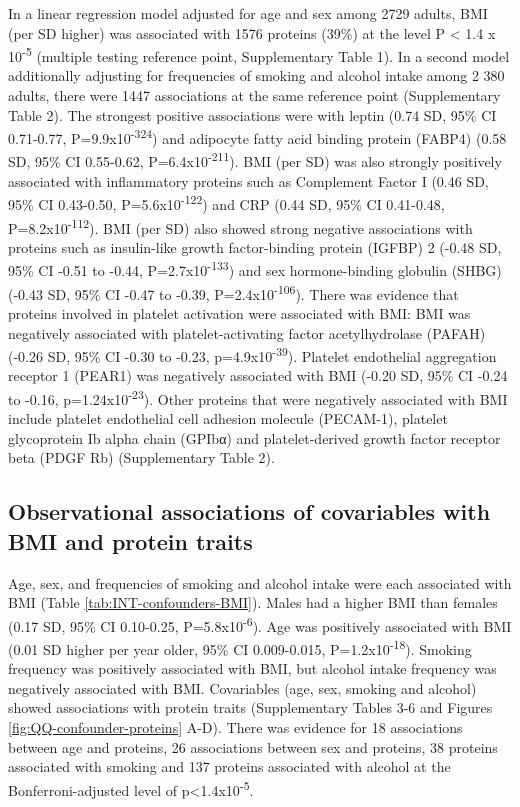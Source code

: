 \documentclass[11pt,twoside]{bristolthesis}
\begin{document}
In a linear regression model adjusted for age and sex among 2729 adults, BMI (per SD higher) was associated with 1576 proteins (39\%) at the level P \textless{} 1.4 x 10\textsuperscript{-5} (multiple testing reference point, Supplementary Table 1). In a second model additionally adjusting for frequencies of smoking and alcohol intake among 2 380 adults, there were 1447 associations at the same reference point (Supplementary Table 2). The strongest positive associations were with leptin (0.74 SD, 95\% CI 0.71-0.77, P=9.9x10\textsuperscript{-324}) and adipocyte fatty acid binding protein (FABP4) (0.58 SD, 95\% CI 0.55-0.62, P=6.4x10\textsuperscript{-211}). BMI (per SD) was also strongly positively associated with inflammatory proteins such as Complement Factor I (0.46 SD, 95\% CI 0.43-0.50, P=5.6x10\textsuperscript{-122}) and CRP (0.44 SD, 95\% CI 0.41-0.48, P=8.2x10\textsuperscript{-112}). BMI (per SD) also showed strong negative associations with proteins such as insulin-like growth factor-binding protein (IGFBP) 2 (-0.48 SD, 95\% CI -0.51 to -0.44, P=2.7x10\textsuperscript{-133}) and sex hormone-binding globulin (SHBG) (-0.43 SD, 95\% CI -0.47 to -0.39, P=2.4x10\textsuperscript{-106}). There was evidence that proteins involved in platelet activation were associated with BMI: BMI was negatively associated with platelet-activating factor acetylhydrolase (PAFAH) (-0.26 SD, 95\% CI -0.30 to -0.23, p=4.9x10\textsuperscript{-39}). Platelet endothelial aggregation receptor 1 (PEAR1) was negatively associated with BMI (-0.20 SD, 95\% CI -0.24 to -0.16, p=1.24x10\textsuperscript{-23}). Other proteins that were negatively associated with BMI include platelet endothelial cell adhesion molecule (PECAM-1), platelet glycoprotein Ib alpha chain (GPIbα) and platelet-derived growth factor receptor beta (PDGF Rb) (Supplementary Table 2).

\hypertarget{observational-associations-of-covariables-with-bmi-and-protein-traits}{%
\subsection{Observational associations of covariables with BMI and protein traits}\label{observational-associations-of-covariables-with-bmi-and-protein-traits}}

Age, sex, and frequencies of smoking and alcohol intake were each associated with BMI (Table \ref{tab:INT-confounders-BMI}). Males had a higher BMI than females (0.17 SD, 95\% CI 0.10-0.25, P=5.8x10\textsuperscript{-6}). Age was positively associated with BMI (0.01 SD higher per year older, 95\% CI 0.009-0.015, P=1.2x10\textsuperscript{-18}). Smoking frequency was positively associated with BMI, but alcohol intake frequency was negatively associated with BMI. Covariables (age, sex, smoking and alcohol) showed associations with protein traits (Supplementary Tables 3-6 and Figures \ref{fig:QQ-confounder-proteins} A-D). There was evidence for 18 associations between age and proteins, 26 associations between sex and proteins, 38 proteins associated with smoking and 137 proteins associated with alcohol at the Bonferroni-adjusted level of p\textless1.4x10\textsuperscript{-5}.
\end{document}
